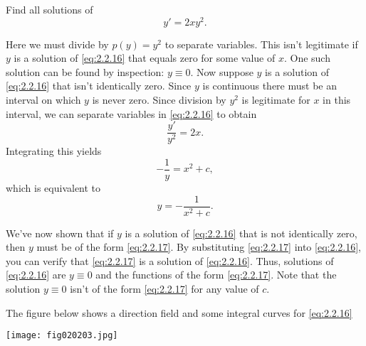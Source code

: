 \documentclass{ximera}
\begin{document}
\begin{example}\label{example:2.2.4}
Find all solutions of
\begin{equation} \label{eq:2.2.16}
y'=2xy^2.
\end{equation}
 
\begin{explanation}
Here we must divide by $p(y)=y^2$ to separate variables.
This isn't  legitimate if $y$ is a solution of \eqref{eq:2.2.16} that
equals zero for some value of $x$. One such solution can be found by
inspection:  $y \equiv 0$. Now suppose   $y$ is a solution
of \eqref{eq:2.2.16} that isn't  identically zero. Since $y$ is continuous there must be an interval on which $y$ is never zero. Since division
by $y^2$ is legitimate for $x$ in this interval, we can separate
variables in \eqref{eq:2.2.16} to obtain
$$
\frac{y'}{y^2}=2x.
$$
 Integrating this yields
$$
-\frac{1}{y}=x^2+c,
$$
which is equivalent to
\begin{equation} \label{eq:2.2.17}
y=-\frac{1}{x^2+c}.
\end{equation}
 
We've now shown that if $y$ is a solution of \eqref{eq:2.2.16} that is
not identically zero, then $y$ must be of the form \eqref{eq:2.2.17}. By
substituting \eqref{eq:2.2.17} into \eqref{eq:2.2.16}, you can verify that
\eqref{eq:2.2.17} is  a solution of \eqref{eq:2.2.16}. Thus,
 solutions of \eqref{eq:2.2.16} are $y\equiv 0$ and the functions
of the form \eqref{eq:2.2.17}. Note that the solution $y\equiv 0$ isn't  of
the form \eqref{eq:2.2.17} for any value of $c$.
 
The figure below shows a direction field and some integral
curves for \eqref{eq:2.2.16}
 
 
\begin{image}
  \texttt{[image: fig020203.jpg]}
\end{image}
\end{explanation}
\end{example}
 
\end{document}
